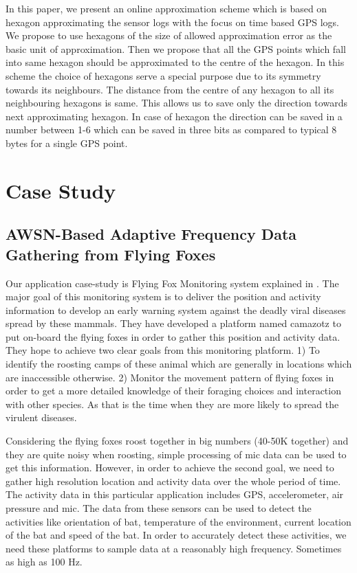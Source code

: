 \documentclass[conference]{IEEEtran}
\begin{document}
In this paper, we present an online approximation scheme which is based on hexagon approximating the sensor logs with the focus on time based GPS logs. We propose to use hexagons of the size of allowed approximation error as the basic unit of approximation. Then we propose that all the GPS points which fall into same hexagon should be approximated to the centre of the hexagon. In this scheme the choice of hexagons serve a special purpose due to its symmetry towards its neighbours. The distance from the centre of any hexagon to all its neighbouring hexagons is same. This allows us to save only the direction towards next approximating hexagon. In case of hexagon the direction can be saved in a number between 1-6 which can be saved in three bits as compared to typical 8 bytes for a single GPS point.

\section{Case Study}
\subsection{AWSN-Based Adaptive Frequency Data Gathering from Flying Foxes} \label{case-study}
Our application case-study is Flying Fox Monitoring system explained in \cite{raja-ipsn}. The major goal of this monitoring system is to deliver the position and activity information to develop an early warning system against the deadly viral diseases spread by these mammals. They have developed a platform named camazotz to put on-board the flying foxes in order to gather this position and activity data. They hope to achieve two clear goals from this monitoring platform. 1) To identify the roosting camps of these animal which are generally in locations which are inaccessible otherwise. 2) Monitor the movement pattern of flying foxes in order to get a more detailed knowledge of their foraging choices and interaction with other species. As that is the time when they are more likely to spread the virulent diseases.\

Considering the flying foxes roost together in big numbers (40-50K together) and they are quite noisy when roosting\cite{Shilton-2008}, simple processing of mic data can be used to get this information. However, in order to achieve the second goal, we need to gather high resolution location and activity data over the whole period of time. The activity data in this particular application includes GPS, accelerometer, air pressure and mic. The data from these sensors can be used to detect the activities like orientation of bat, temperature of the environment, current location of the bat and speed of the bat. In order to accurately detect these activities, we need these platforms to sample data at a reasonably high frequency. Sometimes as high as 100 Hz. \
\end{document}
